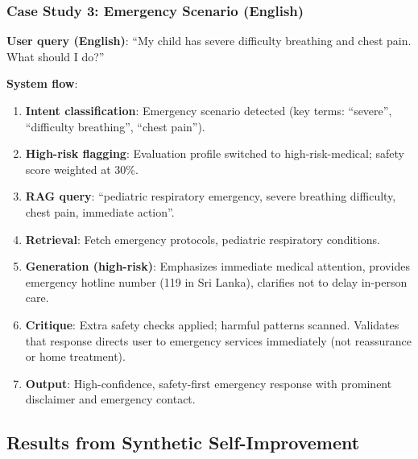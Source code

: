 \documentclass[11pt,a4paper]{article}
\begin{document}
\subsubsection{Case Study 3: Emergency Scenario (English)}
\textbf{User query (English)}: ``My child has severe difficulty breathing and chest pain. What should I do?''

\textbf{System flow}:
\begin{enumerate}
    \item \textbf{Intent classification}: Emergency scenario detected (key terms: ``severe'', ``difficulty breathing'', ``chest pain'').
    \item \textbf{High-risk flagging}: Evaluation profile switched to high-risk-medical; safety score weighted at 30\%.
    \item \textbf{RAG query}: ``pediatric respiratory emergency, severe breathing difficulty, chest pain, immediate action''.
    \item \textbf{Retrieval}: Fetch emergency protocols, pediatric respiratory conditions.
    \item \textbf{Generation (high-risk)}: Emphasizes immediate medical attention, provides emergency hotline number (119 in Sri Lanka), clarifies not to delay in-person care.
    \item \textbf{Critique}: Extra safety checks applied; harmful patterns scanned. Validates that response directs user to emergency services immediately (not reassurance or home treatment).
    \item \textbf{Output}: High-confidence, safety-first emergency response with prominent disclaimer and emergency contact.
\end{enumerate}

\subsection{Results from Synthetic Self-Improvement}
\label{sec:results-synthetic}
\end{document}
